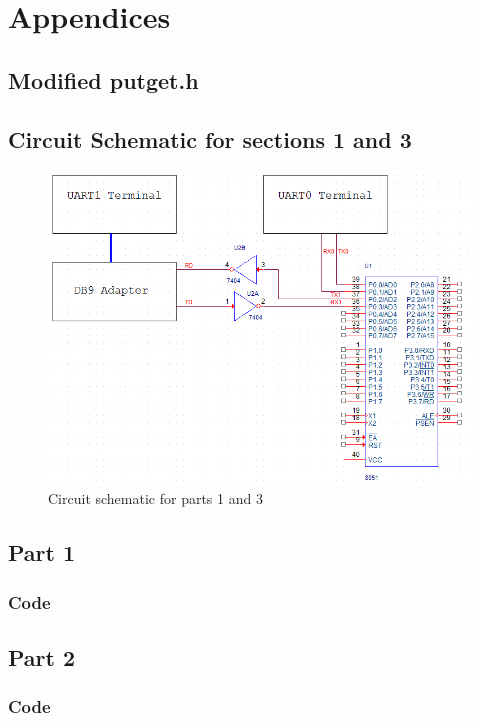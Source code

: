 \documentclass[12pt]{article}
\begin{document}
\pagebreak
\section{Appendices}
\subsection{Modified putget.h}
	
\subsection{Circuit Schematic for sections 1 and 3}
	\begin{figure}[H]
		\centering
		\includegraphics{Part1Schematic.png}
		\caption{Circuit schematic for parts 1 and 3}
		\label{schematic}
	\end{figure} 
\subsection{Part 1}
	\subsubsection{Code}
		
\subsection{Part 2}
	\subsubsection{Code}
			
\end{document}
